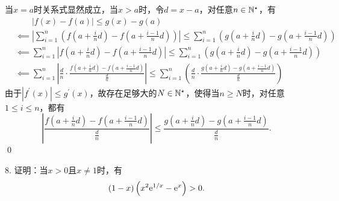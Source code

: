 \prove 当$x=a$时关系式显然成立，当$x>a$时，令$d = x-a$，对任意$n \in \mathbb{N}^\star$，有
\begin{align}
    &\mathrel{\phantom{\impliedby}} \left| f(x) - f(a) \right| \leq g(x) - g(a) \\
    &\impliedby \left| \sum_{i=1}^n \left(f(a+\frac{i}{n} d) - f(a + \frac{i-1}{n}d) \right) \right| \leq \sum_{i=1}^n \left( g(a+\frac{i}{n}d) - g(a+\frac{i-1}{n}d) \right) \\
    &\impliedby \sum_{i=1}^n \left| f(a + \frac{i}{n} d) - f(a+ \frac{i-1}{n} d)\right| \leq \sum_{i=1}^n \left(g(a + \frac{i}{n} d) - g(a + \frac{i-1}{n} d)\right) \\
    &\impliedby \sum_{i=1}^n \left| \frac{d}{n} \cdot \frac{f(a+ \displaystyle\frac{i}{n} d) - f(a+ \displaystyle\frac{i-1}{n} d)}{\displaystyle\frac{d}{n}}\right| \leq \sum_{i=1}^n \left(\frac{d}{n} \cdot \frac{g(a + \displaystyle\frac{i}{n} d) - g(a + \displaystyle\frac{i-1}{n} d)}{\displaystyle\frac{d}{n}}\right)
\end{align}
由于$\left| f^{\prime} (x)\right| \leq g^{\prime} (x)$，故存在足够大的$N \in \mathbb{N}^\star$，使得当$n \geq N$时，对任意$1 \leq i \leq n$，都有
\begin{equation}
    \left| \frac{f(a + \displaystyle\frac{i}{n} d) - f(a + \displaystyle\frac{i-1}{n} d)}{\displaystyle\frac{d}{n}} \right| \leq \frac{g(a + \displaystyle\frac{i}{n} d) - g(a + \displaystyle\frac{i-1}{n} d)}{\displaystyle\frac{d}{n}}.
\end{equation}
\qed\bigskip

8. 证明：当$x>0$且$x\neq 1$时，有
\begin{equation*}
    \left(1-x\right)\left(x^2 \mathrm{e}^{1/x}-\mathrm{e}^{x}\right) > 0.
\end{equation*}

